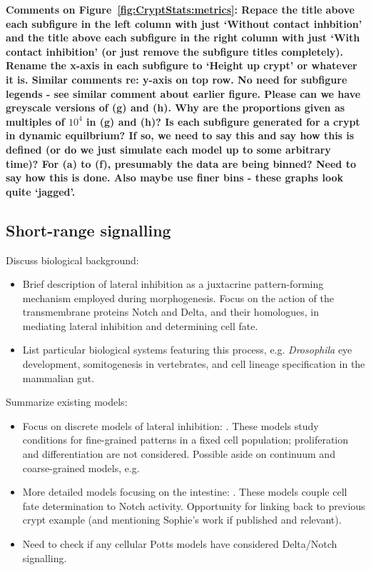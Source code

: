 \documentclass[12pt]{article}
\newcommand{\highlight}[1]{{\color{red} \bf{#1}}}
\begin{document}
\highlight{Comments on Figure~\ref{fig:CryptStats:metrics}: 
Repace the title above each subfigure in the left column with just `Without contact inhbition' and the title above each subfigure in the right column with just `With contact inhibition' (or just remove the subfigure titles completely). 
Rename the x-axis in each subfigure to `Height up crypt' or whatever it is. Similar comments re: y-axis on top row. 
No need for subfigure legends - see similar comment about earlier figure. 
Please can we have greyscale versions of (g) and (h). 
Why are the proportions given as multiples of $10^4$ in (g) and (h)? 
Is each subfigure generated for a crypt in dynamic equilbrium? 
If so, we need to say this and say how this is defined (or do we just simulate each model up to some arbitrary time)? 
For (a) to (f), presumably the data are being binned? Need to say how this is done. 
Also maybe use finer bins - these graphs look quite `jagged'.
}


\subsection{Short-range signalling} \label{sec:juxtacrine}

Discuss biological background:
\begin{itemize}
\item Brief description of lateral inhibition as a juxtacrine pattern-forming mechanism employed during morphogenesis. Focus on the action of the transmembrane proteins Notch and Delta, and their homologues, in mediating lateral inhibition and determining cell fate.
\item List particular biological systems featuring this process, e.g. {\it Drosophila} eye development, somitogenesis in vertebrates, and cell lineage specification in the mammalian gut.
\end{itemize}

\noindent Summarize existing models:
\begin{itemize}
\item Focus on discrete models of lateral inhibition: \citet{Collier1996Pattern, Owen1998Mathematical, Wearing2001Nonlinear, Webb2004Oscillations}. These models study conditions for fine-grained patterns in a fixed cell population; proliferation and differentiation are not considered. Possible aside on continuum and coarse-grained models, e.g. \citet{ODea2011Continuum}
\item More detailed models focusing on the intestine: \citet{Buske2011Comprehensive, Pin2012Modelling}. These models couple cell fate determination to Notch activity. Opportunity for linking back to previous crypt example (and mentioning Sophie's work if published and relevant).
\item Need to check if any cellular Potts models have considered Delta/Notch signalling.
\end{itemize}
\end{document}
